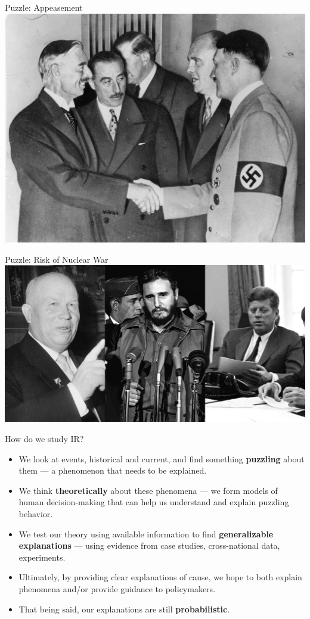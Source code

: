 \documentclass[handout]{beamer}
\begin{document}
\begin{frame}{\LARGE Puzzle: Appeasement}
    \centering
\includegraphics[width=\textwidth,height=.9\textheight,keepaspectratio]{Hitler appeasement.jpg}
\end{frame}

\begin{frame}{\LARGE Puzzle: Risk of Nuclear War}
    \centering
\includegraphics[width=\textwidth,height=0.8\textheight,keepaspectratio]{cuban missile crisis.jpg}
\end{frame}


\begin{frame}{\LARGE How do we study IR?}
\begin{itemize}
    \item We look at events, historical and current, and find something \textbf{puzzling} about them --- a phenomenon that needs to be explained. 
    \item We think \textbf{theoretically} about these phenomena --- we form models of human decision-making that can help us understand and explain puzzling behavior. \pause
    \item We test our theory using available information to find \textbf{generalizable explanations} --- using evidence from case studies, cross-national data, experiments. \pause
    \item Ultimately, by providing clear explanations of cause, we hope to both explain phenomena and/or provide guidance to policymakers. \pause
    \item That being said, our explanations are still \textbf{probabilistic}.
    \end{itemize}
\end{frame}
\end{document}
